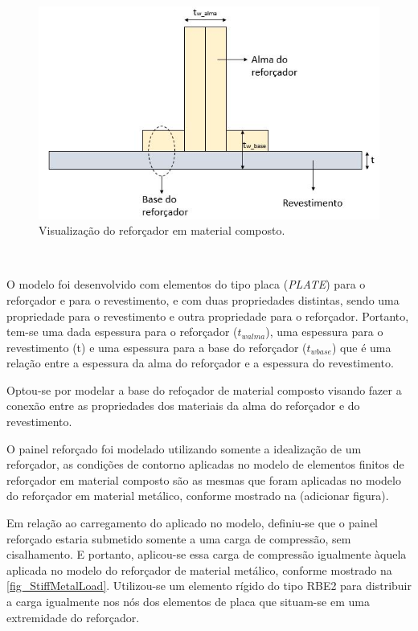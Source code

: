 {\begin{figure}[ht]
 \caption{\label{fig_StiffCompositeMaterial}Visualização do reforçador em material composto.}
 \centering
 \includegraphics[scale=0.7]{figura/StiffCompositeMaterial}
\end{figure}
\

O modelo foi desenvolvido com elementos do tipo placa (\emph{PLATE}) para o reforçador e para o revestimento, e com duas propriedades distintas, sendo uma propriedade para o revestimento e outra propriedade para o reforçador. Portanto, tem-se uma dada espessura para o reforçador ($t_{w alma}$), uma espessura para o revestimento (t) e uma espessura para a base do reforçador ($t_{w base}$) que é uma relação entre a espessura da alma do reforçador e a espessura do revestimento.

Optou-se por modelar a base do refoçador de material composto visando fazer a conexão entre as propriedades dos materiais da alma do reforçador e do revestimento.

O painel reforçado foi modelado utilizando somente a idealização de um reforçador, as condições de contorno aplicadas no modelo de elementos finitos de reforçador em material composto são as mesmas que foram aplicadas no modelo do reforçador em material metálico, conforme mostrado na (adicionar figura). %

Em relação ao carregamento do aplicado no modelo, definiu-se que o painel reforçado estaria submetido somente a uma carga de compressão, sem cisalhamento. E portanto, aplicou-se essa carga de compressão igualmente àquela aplicada no modelo do reforçador de material metálico, conforme mostrado na \autoref{fig_StiffMetalLoad}. Utilizou-se um elemento rígido do tipo RBE2 para distribuir a carga igualmente nos nós dos elementos de placa que situam-se em uma extremidade do reforçador.

}
